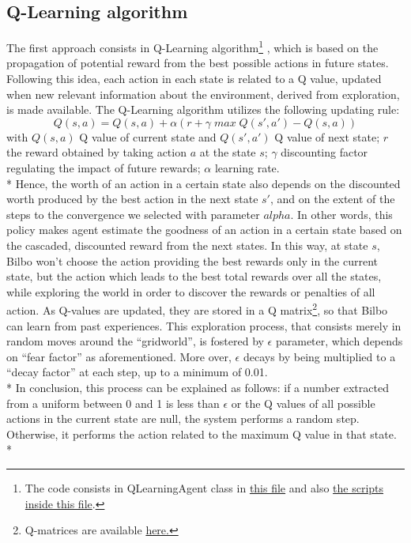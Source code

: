 \subsection{Q-Learning algorithm}
The first approach consists in Q-Learning algorithm\footnote{The code consists in QLearningAgent class in \href{https://github.com/moiraghif/DragonHunting/blob/master/Bilbo\%20World/agents.py}{this file} and also \href{https://github.com/moiraghif/DragonHunting/blob/master/Bilbo\%20World/Bilbo_q_learning.py}{the scripts inside this file}.} \cite{2}, which is based on the propagation of potential reward from the best possible actions in future states. Following this idea, each action in each state is related to a Q value, updated when new relevant information about the environment, derived from exploration, is made available. The Q-Learning algorithm utilizes the following updating rule:
$${\scriptstyle Q(s,a)=Q(s,a)+\alpha(r+\gamma\;max\;Q(s',a') - Q(s,a))}$$
with $Q(s,a)$ Q value of current state and $Q(s',a')$ Q value of next state; $r$ the reward obtained by taking action $a$ at the state $s$; $\gamma$ discounting factor regulating the impact of future rewards; $\alpha$ learning rate.\\*
Hence, the worth of an action in a certain state also depends on the discounted worth produced by the best action in the next state $s'$, and on the extent of the steps to the convergence we selected with parameter $alpha$. In other words, this policy makes agent estimate the goodness of an action in a certain state based on the cascaded, discounted reward from the next states. In this way, at state $s$, Bilbo won't choose the action providing the best rewards only in the current state, but the action which leads to the best total rewards over all the states, while exploring the world in order to discover the rewards or penalties of all action. As Q-values are updated, they are stored in a Q matrix\footnote{Q-matrices are available \href{https://github.com/moiraghif/DragonHunting/tree/master/Bilbo\%20World/models}{here.}}, so that Bilbo can learn from past experiences. This exploration process, that consists merely in random moves around the ``gridworld'', is fostered by $\epsilon$ parameter, which depends on ``fear factor'' as aforementioned. More over, $\epsilon$ decays by being multiplied to a ``decay factor'' at each step, up to a minimum of 0.01.\\*
In conclusion, this process can be explained as follows: if a number extracted from a uniform between 0 and 1 is less than $\epsilon$ or the Q values of all possible actions in the current state are null, the system performs a random step. Otherwise, it performs the action related to the maximum Q value in that state.\\*
